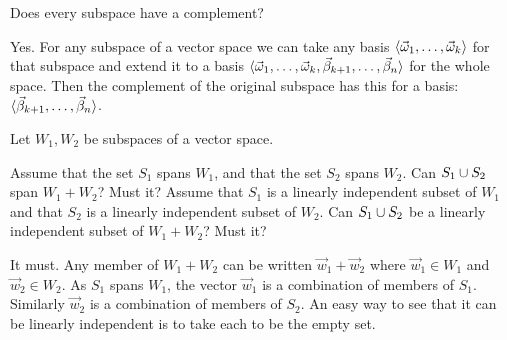 \begin{exercises}
  \recommended \item 
    Does every subspace have a complement?
    \begin{answer}
      Yes.
      For any subspace of a vector space we can take any
      basis \( \langle\vec{\omega}_1,\dots,\vec{\omega}_k\rangle \) for that
      subspace and extend it to a basis
      \( \langle\vec{\omega}_1,\dots,\vec{\omega}_k,
                     \vec{\beta}_{k+1},\dots,\vec{\beta}_n\rangle \) for the whole
      space.
      Then the complement of the original subspace has this for a basis:
      \( \langle\vec{\beta}_{k+1},\dots,\vec{\beta}_n\rangle \).  
     \end{answer}
  \recommended \item 
    Let \( W_1, W_2 \) be subspaces of a vector space.
    \begin{exparts}
      \partsitem Assume that 
        the set \( S_1 \) spans \( W_1 \), and that the set \( S_2 \) spans 
        \( W_2 \).
        Can \( S_1\cup S_2 \) span \( W_1+W_2 \)?
        Must it?
      \partsitem Assume that \( S_1 \) is a linearly independent 
        subset of \( W_1 \)
        and that \( S_2 \) is a linearly independent subset of \( W_2 \).
        Can \( S_1\cup S_2 \) be a linearly independent subset of
        \( W_1+W_2 \)?
        Must it?
    \end{exparts}
    \begin{answer}
      \begin{exparts}
        \partsitem It must.
          Any member of \( W_1+W_2 \) can be written \( \vec{w}_1+\vec{w}_2 \)
          where \( \vec{w}_1\in W_1 \) and \( \vec{w}_2\in W_2 \).
          As \( S_1 \) spans \( W_1 \), the vector \( \vec{w}_1 \) is a
          combination of members of \( S_1 \).
          Similarly \( \vec{w}_2 \) is a combination of members of \( S_2 \).
        \partsitem An easy way to see that it can be linearly independent 
          is to take each to be the empty set.

\end{exparts}
\end{answer}
\end{exercises}
